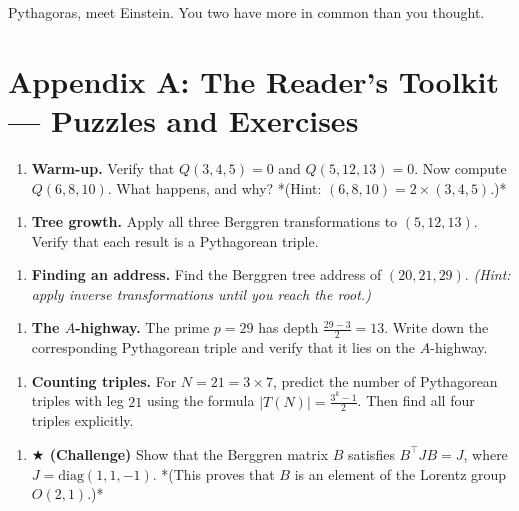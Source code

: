Pythagoras, meet Einstein. You two have more in common than you thought.


\ornbreak



\section{Appendix A: The Reader's Toolkit --- Puzzles and Exercises}


\begin{enumerate}[leftmargin=*]
\item \textbf{Warm-up.} Verify that $Q(3, 4, 5) = 0$ and $Q(5, 12, 13) = 0$. Now compute $Q(6, 8, 10)$. What happens, and why? *(Hint: $(6, 8, 10) = 2 \times (3, 4, 5)$.)*
\end{enumerate}

\begin{enumerate}[leftmargin=*]
\item \textbf{Tree growth.} Apply all three Berggren transformations to $(5, 12, 13)$. Verify that each result is a Pythagorean triple.
\end{enumerate}

\begin{enumerate}[leftmargin=*]
\item \textbf{Finding an address.} Find the Berggren tree address of $(20, 21, 29)$. \textit{(Hint: apply inverse transformations until you reach the root.)}
\end{enumerate}

\begin{enumerate}[leftmargin=*]
\item \textbf{The $A$-highway.} The prime $p = 29$ has depth $\frac{29 - 3}{2} = 13$. Write down the corresponding Pythagorean triple and verify that it lies on the $A$-highway.
\end{enumerate}

\begin{enumerate}[leftmargin=*]
\item \textbf{Counting triples.} For $N = 21 = 3 \times 7$, predict the number of Pythagorean triples with leg $21$ using the formula $|T(N)| = \frac{3^k - 1}{2}$. Then find all four triples explicitly.
\end{enumerate}

\begin{enumerate}[leftmargin=*]
\item \textbf{$\bigstar$ (Challenge)} Show that the Berggren matrix $B$ satisfies $B^\top J B = J$, where $J = \text{diag}(1, 1, -1)$. *(This proves that $B$ is an element of the Lorentz group $O(2,1)$.)*
\end{enumerate}

